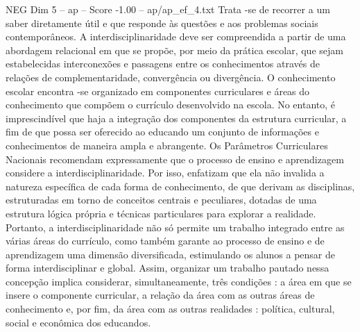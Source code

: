 \begin{textsample}{NEG Dim 5 – ap – Score -1.00 – ap/ap\_ef\_4.txt}
Trata -se de recorrer a um saber diretamente útil e que responde às questões e aos problemas sociais contemporâneos.
A interdisciplinaridade deve ser compreendida a partir de uma abordagem relacional em que se propõe, por meio da prática escolar, que sejam estabelecidas interconexões e passagens entre os conhecimentos através de relações de complementaridade, convergência ou divergência.
O conhecimento escolar encontra -se organizado em componentes curriculares e áreas do conhecimento que compõem o currículo desenvolvido na escola.
No entanto, é imprescindível que haja a integração dos componentes da estrutura curricular, a fim de que possa ser oferecido ao educando um conjunto de informações e conhecimentos de maneira ampla e abrangente.
Os Parâmetros Curriculares Nacionais recomendam expressamente que o processo de ensino e aprendizagem considere a interdisciplinaridade.
Por isso, enfatizam que ela não invalida a natureza específica de cada forma de conhecimento, de que derivam as disciplinas, estruturadas em torno de conceitos centrais e peculiares, dotadas de uma estrutura lógica própria e técnicas particulares para explorar a realidade.
Portanto, a interdisciplinaridade não só permite um trabalho integrado entre as várias áreas do currículo, como também garante ao processo de ensino e de aprendizagem uma dimensão diversificada, estimulando os alunos a pensar de forma interdisciplinar e global.
Assim, organizar um trabalho pautado nessa concepção implica considerar, simultaneamente, três condições : a área em que se insere o componente curricular, a relação da área com as outras áreas de conhecimento e, por fim, da área com as outras realidades : política, cultural, social e econômica dos educandos.

\end{textsample}
